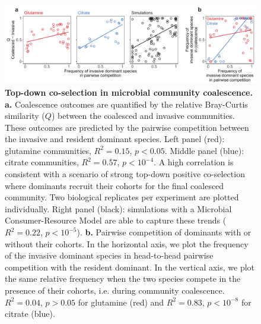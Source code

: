 \documentclass[a4paper,10pt]{article}
\begin{document}
\clearpage

\begin{figure}[!h]
\centering
\internallinenumbers
\includegraphics[scale=0.7,keepaspectratio]{figs/fig2_v4.pdf}
\caption{\textbf{Top-down co-selection in microbial community coalescence.}
\textbf{a.} Coalescence outcomes are quantified by the relative Bray-Curtis similarity
($Q$) between the coalesced and invasive communities.
These outcomes are predicted by the pairwise competition between the invasive and
resident dominant species.
Left panel (red): glutamine communities, $R^2=0.15$, $p<0.05$.
Middle panel (blue): citrate communities, $R^2=0.57$, $p<10^{-4}$.
A high correlation is consistent with a scenario of
strong top-down positive co-selection where dominants recruit their cohorts for the final
coalesced community. Two biological replicates per experiment are plotted individually.
Right panel (black): simulations with a Microbial Consumer-Resource Model are able
to capture these trends ($R^2=0.22$, $p<10^{-5}$).
\textbf{b.} Pairwise competition of dominants with or without their cohorts.
In the horizontal axis, we plot the frequency of the invasive dominant species
in head-to-head pairwise competition with the resident dominant.
In the vertical axis, we plot the same relative frequency when the two species compete
in the presence of their cohorts, i.e. during community coalescence.
$R^2=0.04$, $p>0.05$ for glutamine (red)
and $R^2=0.83$, $p<10^{-8}$ for citrate (blue).
}
\label{fig2}
\end{figure}

\clearpage
\end{document}
